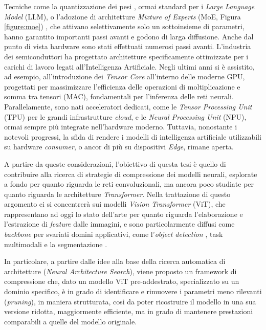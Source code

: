 Tecniche come la quantizzazione dei pesi \cite{jacob2017quantizationtrainingneuralnetworks}, ormai standard per i \textit{Large Language Model} (LLM), o l'adozione di architetture \textit{Mixture of Experts} (MoE, Figura \ref{figure:moe}) \cite{jiang2024mixtral}, che attivano selettivamente solo un sottoinsieme di parametri, hanno garantito importanti passi avanti e godono di larga diffusione. Anche dal punto di vista hardware sono stati effettuati numerosi passi avanti. L'industria dei semiconduttori ha progettato architetture specificamente ottimizzate per i carichi di lavoro legati all'Intelligenza Artificiale. Negli ultimi anni si è assistito, ad esempio, all'introduzione dei \textit{Tensor Core} \cite{TensorCores} all'interno delle moderne GPU, progettati per massimizzare l'efficienza delle operazioni di moltiplicazione e somma tra tensori (MAC), fondamentali per l'inferenza delle reti neurali. Parallelamente, sono nati acceleratori dedicati, come le \textit{Tensor Processing Unit} (TPU) per le grandi infrastrutture \textit{cloud}, e le \textit{Neural Processing Unit} (NPU), ormai sempre più integrate nell'hardware moderno. Tuttavia, nonostante i notevoli progressi, la sfida di rendere i modelli di intelligenza artificiale utilizzabili su hardware \textit{consumer}, o ancor di più su dispositivi \textit{Edge}, rimane aperta. \par
A partire da queste considerazioni, l'obiettivo di questa tesi è quello di contribuire alla ricerca di strategie di compressione dei modelli neurali, esplorate a fondo per quanto riguarda le reti convoluzionali, ma ancora poco studiate per quanto riguarda le architetture \textit{Transformer}. Nella trattazione di questo argomento ci si concentrerà sui modelli \textit{Vision Transformer} \cite{dosovitskiy2021imageworth16x16words} (ViT), che rappresentano ad oggi lo stato dell'arte per quanto riguarda l'elaborazione e l'estrazione di \textit{feature} dalle immagini, e sono particolarmente diffusi come \textit{backbone} per svariati domini applicativi, come l'\textit{object detection} \cite{carion2020endtoendobjectdetectiontransformers,li2022exploringplainvisiontransformer}, task multimodali \cite{radford2021learningtransferablevisualmodels,zhai2023sigmoidlosslanguageimage} e la segmentazione \cite{kirillov2023segment}. \par
In particolare, a partire dalle idee alla base della ricerca automatica di architetture (\textit{Neural Architecture Search}), viene proposto un framework di compressione che, dato un modello ViT pre-addestrato, specializzato su un dominio specifico, è in grado di identificare e rimuovere i parametri meno rilevanti (\textit{pruning}), in maniera strutturata, così da poter ricostruire il modello in una sua versione ridotta, maggiormente efficiente, ma in grado di mantenere prestazioni comparabili a quelle del modello originale. \par
